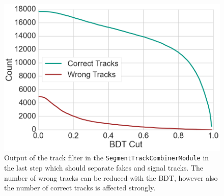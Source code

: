 \begin{figure}
  \centering
  \includegraphics[width=0.7\linewidth]{figures/workflow/track_filter_count.png}
  \caption{Output of the track filter in the \texttt{SegmentTrackCombinerModule} in the last step which should separate fakes and signal tracks. The number of wrong tracks can be reduced with the BDT, however also the number of correct tracks is affected strongly.}
  \label{fig-track-filter-count}
\end{figure}

